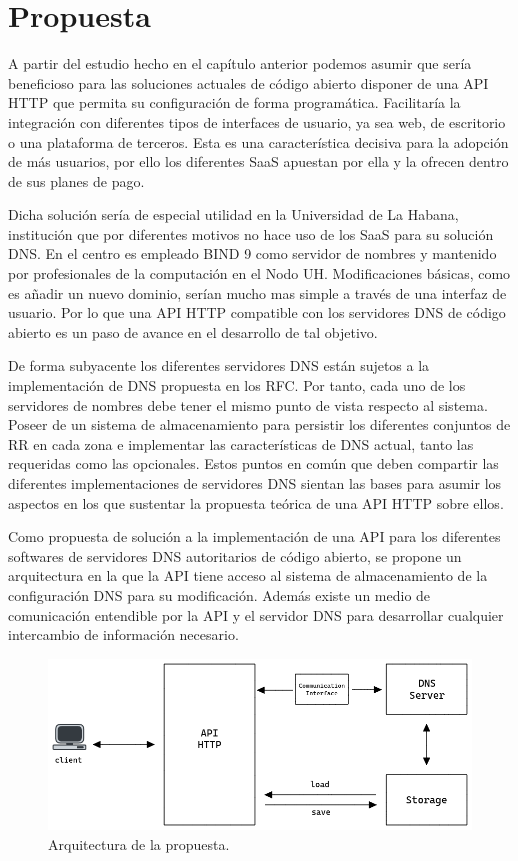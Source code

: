 \chapter{Propuesta}\label{chapter:proposal}

A partir del estudio hecho en el capítulo anterior podemos asumir que sería beneficioso para las soluciones actuales de código abierto disponer de una API HTTP que permita su configuración de forma programática. Facilitaría la integración con diferentes tipos de interfaces de usuario, ya sea web, de escritorio o una plataforma de terceros. Esta es una característica decisiva para la adopción de más usuarios, por ello los diferentes SaaS apuestan por ella y la ofrecen dentro de sus planes de pago.

Dicha solución sería de especial utilidad en la Universidad de La Habana, institución que por diferentes motivos no hace uso de los SaaS para su solución DNS. En el centro es empleado BIND 9 como servidor de nombres y mantenido por profesionales de la computación en el Nodo UH. Modificaciones básicas, como es añadir un nuevo dominio, serían mucho mas simple a través de una interfaz de usuario. Por lo que una API HTTP compatible con los servidores DNS de código abierto es un paso de avance en el desarrollo de tal objetivo.

De forma subyacente los diferentes servidores DNS están sujetos a la implementación de DNS propuesta en los RFC. Por tanto, cada uno de los servidores de nombres debe tener el mismo punto de vista respecto al sistema. Poseer de un sistema de almacenamiento para persistir los diferentes conjuntos de RR en cada zona e implementar las características de DNS actual, tanto las requeridas como las opcionales. Estos puntos en común que deben compartir las diferentes implementaciones de servidores DNS sientan las bases para asumir los aspectos en los que sustentar la propuesta teórica de una API HTTP sobre ellos.

Como propuesta de solución a la implementación de una API para los diferentes softwares de servidores DNS autoritarios de código abierto, se propone un arquitectura en la que la API tiene acceso al sistema de almacenamiento de la configuración DNS para su modificación. Además existe un medio de comunicación entendible por la API y el servidor DNS para desarrollar cualquier intercambio de información necesario.

\begin{figure}[!ht]
    \centering
    \includegraphics[width=\linewidth]{draws/proposal.png}
    \caption{Arquitectura de la propuesta.}
\end{figure}

